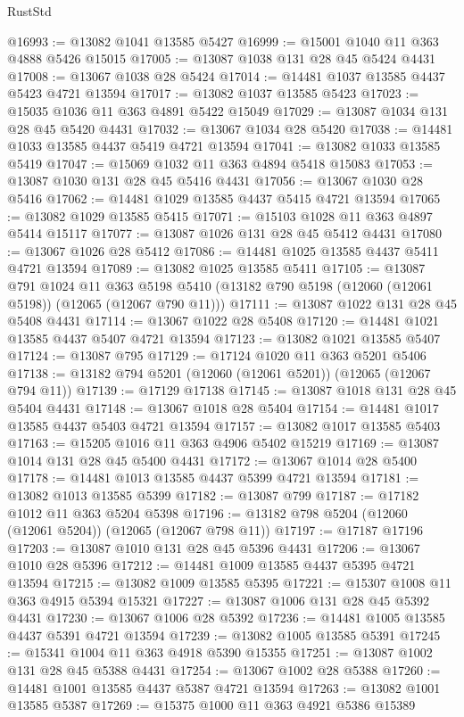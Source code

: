 \begin{lexlean}{RustStd}
\begin{coremodule}
@16993 := @13082 @1041 @13585 @5427
@16999 := @15001 @1040 @11 @363 @4888 @5426 @15015
@17005 := @13087 @1038 @131 @28 @45 @5424 @4431
@17008 := @13067 @1038 @28 @5424
@17014 := @14481 @1037 @13585 @4437 @5423 @4721 @13594
@17017 := @13082 @1037 @13585 @5423
@17023 := @15035 @1036 @11 @363 @4891 @5422 @15049
@17029 := @13087 @1034 @131 @28 @45 @5420 @4431
@17032 := @13067 @1034 @28 @5420
@17038 := @14481 @1033 @13585 @4437 @5419 @4721 @13594
@17041 := @13082 @1033 @13585 @5419
@17047 := @15069 @1032 @11 @363 @4894 @5418 @15083
@17053 := @13087 @1030 @131 @28 @45 @5416 @4431
@17056 := @13067 @1030 @28 @5416
@17062 := @14481 @1029 @13585 @4437 @5415 @4721 @13594
@17065 := @13082 @1029 @13585 @5415
@17071 := @15103 @1028 @11 @363 @4897 @5414 @15117
@17077 := @13087 @1026 @131 @28 @45 @5412 @4431
@17080 := @13067 @1026 @28 @5412
@17086 := @14481 @1025 @13585 @4437 @5411 @4721 @13594
@17089 := @13082 @1025 @13585 @5411
@17105 := @13087
    @791
    @1024
    @11
    @363
    @5198
    @5410
    (@13182 @790 @5198 (@12060 (@12061 @5198)) (@12065 (@12067 @790 @11)))
@17111 := @13087 @1022 @131 @28 @45 @5408 @4431
@17114 := @13067 @1022 @28 @5408
@17120 := @14481 @1021 @13585 @4437 @5407 @4721 @13594
@17123 := @13082 @1021 @13585 @5407
@17124 := @13087 @795
@17129 := @17124 @1020 @11 @363 @5201 @5406
@17138 := @13182 @794 @5201 (@12060 (@12061 @5201)) (@12065 (@12067 @794 @11))
@17139 := @17129 @17138
@17145 := @13087 @1018 @131 @28 @45 @5404 @4431
@17148 := @13067 @1018 @28 @5404
@17154 := @14481 @1017 @13585 @4437 @5403 @4721 @13594
@17157 := @13082 @1017 @13585 @5403
@17163 := @15205 @1016 @11 @363 @4906 @5402 @15219
@17169 := @13087 @1014 @131 @28 @45 @5400 @4431
@17172 := @13067 @1014 @28 @5400
@17178 := @14481 @1013 @13585 @4437 @5399 @4721 @13594
@17181 := @13082 @1013 @13585 @5399
@17182 := @13087 @799
@17187 := @17182 @1012 @11 @363 @5204 @5398
@17196 := @13182 @798 @5204 (@12060 (@12061 @5204)) (@12065 (@12067 @798 @11))
@17197 := @17187 @17196
@17203 := @13087 @1010 @131 @28 @45 @5396 @4431
@17206 := @13067 @1010 @28 @5396
@17212 := @14481 @1009 @13585 @4437 @5395 @4721 @13594
@17215 := @13082 @1009 @13585 @5395
@17221 := @15307 @1008 @11 @363 @4915 @5394 @15321
@17227 := @13087 @1006 @131 @28 @45 @5392 @4431
@17230 := @13067 @1006 @28 @5392
@17236 := @14481 @1005 @13585 @4437 @5391 @4721 @13594
@17239 := @13082 @1005 @13585 @5391
@17245 := @15341 @1004 @11 @363 @4918 @5390 @15355
@17251 := @13087 @1002 @131 @28 @45 @5388 @4431
@17254 := @13067 @1002 @28 @5388
@17260 := @14481 @1001 @13585 @4437 @5387 @4721 @13594
@17263 := @13082 @1001 @13585 @5387
@17269 := @15375 @1000 @11 @363 @4921 @5386 @15389

\end{coremodule}
\end{lexlean}
